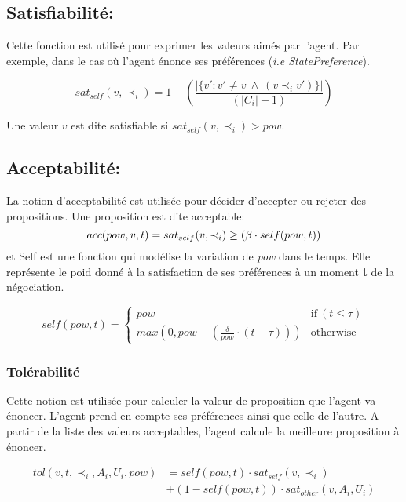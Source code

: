 \documentclass{llncs}
\begin{document}
	\subsection{Satisfiabilité:}
	
	Cette fonction est utilisé pour exprimer les valeurs aimés par l'agent. Par exemple, dans le cas o\`u l'agent énonce ses préférences (\textit{i.e StatePreference}).
	
	\begin{equation}
	sat_{self}(v, \prec_i) =	1 - \left( \frac{|\{v' : v' \neq v \  \wedge \ (v \prec_i v')\}| }{( |C_i| - 1 )}\right)
	\end{equation}
	
	Une valeur $v$ est dite satisfiable si $ sat_{self}(v, \prec_i) > pow$.
	
	\subsection{Acceptabilité:}
	La notion d'acceptabilité est utilisée pour décider d'accepter ou rejeter des propositions. Une proposition est dite acceptable: 
	\begin{equation}
	\vspace{-.5em} 
	acc(pow,v, t) = sat_{self}(v, \prec_i) \geq  (\beta \cdot self(pow,t))
	\end{equation}
	et Self est une fonction qui modélise la variation de \textit{pow} dans le temps. Elle représente le poid donné à la satisfaction de ses préférences à un moment \textbf{t} de la négociation. 
	
	\begin{equation}
	self(pow, t) = \left\{\begin{array}{ll}
	pow & \mathrm{if\ } (t \leq \tau)\\
	max(0, pow - (\frac{\delta}{pow} \cdot (t - \tau))) & \mathrm{otherwise}
	\end{array}\right.
	\end{equation}
	
	\subsubsection{Tolérabilité}
	Cette notion est utilisée pour calculer la valeur de proposition que l'agent va énoncer. L'agent prend en compte ses préférences ainsi que celle de l'autre. A partir de la liste des valeurs acceptables, l'agent calcule la meilleure proposition à énoncer. 
	
	\begin{equation}
	\begin{split}
	tol(v, t, \prec_i, A_i, U_i, pow) & = self(pow, t)  \cdot sat_{self}(v, \prec_i) \\
	& +  (1 - self(pow, t)) \cdot sat_{other}(v, A_i, U_i)
	\end{split} 
	\end{equation}
	
\end{document}
